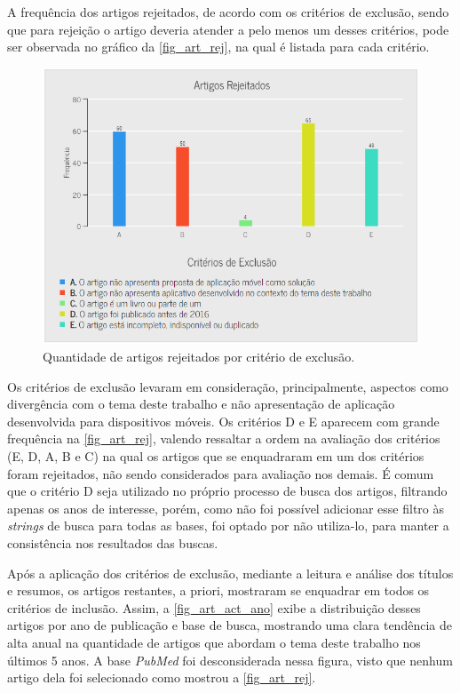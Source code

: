 \newpage

A frequência dos artigos rejeitados, de acordo com os critérios de exclusão, sendo que para rejeição o artigo deveria atender a
pelo menos um desses critérios, pode ser observada no gráfico da \autoref{fig_art_rej}, na qual é listada para cada critério.

\begin{figure}[htb]
  \caption{\label{fig_art_rej}Quantidade de artigos rejeitados por critério de exclusão.}
  \begin{center}
    \includegraphics[scale=0.6]{Imagens/msl/artigos_rejeitados.png}
  \end{center}
\end{figure}

Os critérios de exclusão levaram em consideração, principalmente, aspectos como divergência com o tema deste trabalho e não apresentação de aplicação desenvolvida para dispositivos móveis.
Os critérios D e E aparecem com grande frequência na \autoref{fig_art_rej}, valendo ressaltar a ordem na avaliação dos critérios (E, D, A, B e C) na qual os artigos que se enquadraram em um dos critérios foram rejeitados, não sendo considerados para avaliação nos demais.
É comum que o critério D seja utilizado no próprio processo de busca dos artigos, filtrando apenas os anos de interesse, porém, como não foi possível adicionar esse filtro às \emph{strings} de busca para todas as bases, foi optado por não utiliza-lo, para manter a consistência nos resultados das buscas.

Após a aplicação dos critérios de exclusão, mediante a leitura e análise dos títulos e resumos, os artigos restantes, a priori, mostraram se enquadrar em todos os critérios de inclusão.
Assim, a \autoref{fig_art_act_ano} exibe a distribuição desses artigos por ano de publicação e base de busca, mostrando uma clara
tendência de alta anual na quantidade de artigos que abordam o tema deste trabalho nos últimos 5 anos.
A base \emph{PubMed} foi desconsiderada nessa figura, visto que nenhum artigo dela foi selecionado como mostrou a \autoref{fig_art_rej}.


